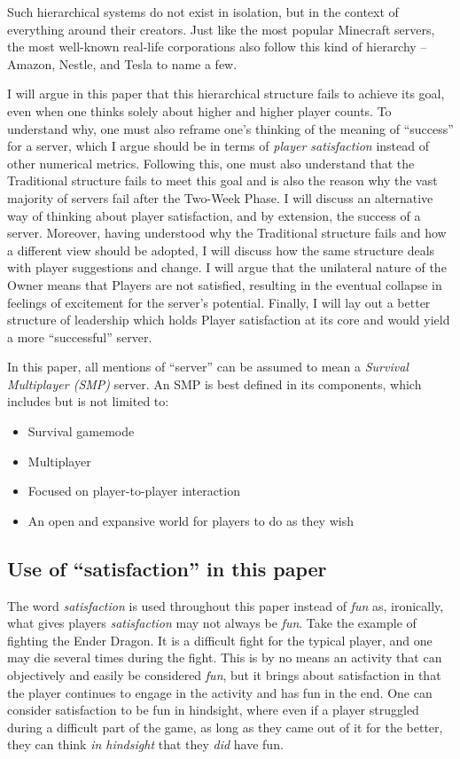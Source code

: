 Such hierarchical systems do not exist in isolation, but in the context of everything around their creators. Just like the most popular Minecraft servers, the most well-known real-life corporations also follow this kind of hierarchy – Amazon, Nestle, and Tesla to name a few.

I will argue in this paper that this hierarchical structure fails to achieve its goal, even when one thinks solely about higher and higher player counts. To understand why, one must also reframe one’s thinking of the meaning of “success” for a server, which I argue should be in terms of \emph{player satisfaction} instead of other numerical metrics. Following this, one must also understand that the Traditional structure fails to meet this goal and is also the reason why the vast majority of servers fail after the Two-Week Phase. I will discuss an alternative way of thinking about player satisfaction, and by extension, the success of a server. Moreover, having understood why the Traditional structure fails and how a different view should be adopted, I will discuss how the same structure deals with player suggestions and change. I will argue that the unilateral nature of the Owner means that Players are not satisfied, resulting in the eventual collapse in feelings of excitement for the server’s potential. Finally, I will lay out a better structure of leadership which holds Player satisfaction at its core and would yield a more “successful” server.

In this paper, all mentions of “server” can be assumed to mean a \emph{Survival Multiplayer (SMP)} server. An SMP is best defined in its components, which includes but is not limited to:\begin{itemize}
    \item Survival gamemode
    \item Multiplayer
    \item Focused on player-to-player interaction
    \item An open and expansive world for players to do as they wish
\end{itemize}

\subsection{Use of ``satisfaction'' in this paper}
The word \emph{satisfaction} is used throughout this paper instead of \emph{fun} as, ironically, what gives players \emph{satisfaction} may not always be \emph{fun}. Take the example of fighting the Ender Dragon. It is a difficult fight for the typical player, and one may die several times during the fight. This is by no means an activity that can objectively and easily be considered \emph{fun}, but it brings about satisfaction in that the player continues to engage in the activity and has fun in the end. One can consider satisfaction to be fun in hindsight, where even if a player struggled during a difficult part of the game, as long as they came out of it for the better, they can think \emph{in hindsight} that they \emph{did} have fun.

